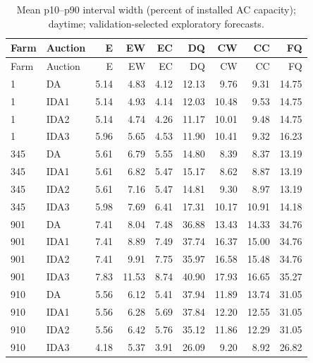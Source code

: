 \documentclass[11pt,a4paper]{article}
\begin{document}
\begin{longtable}{llrrrrrrr}
\caption{Mean p10--p90 interval width (percent of installed AC capacity); daytime; validation-selected exploratory forecasts.}\\
\toprule Farm & Auction & E & EW & EC & DQ & CW & CC & FQ \\
\midrule\endfirsthead
\toprule Farm & Auction & E & EW & EC & DQ & CW & CC & FQ \\
\midrule\endhead
1 & DA & 5.14 & 4.83 & 4.12 & 12.13 & 9.76 & 9.31 & 14.75 \\
1 & IDA1 & 5.14 & 4.93 & 4.14 & 12.03 & 10.48 & 9.53 & 14.75 \\
1 & IDA2 & 5.14 & 4.74 & 4.26 & 11.17 & 10.01 & 9.48 & 14.75 \\
1 & IDA3 & 5.96 & 5.65 & 4.53 & 11.90 & 10.41 & 9.32 & 16.23 \\
\midrule
345 & DA & 5.61 & 6.79 & 5.55 & 14.80 & 8.39 & 8.37 & 13.19 \\
345 & IDA1 & 5.61 & 6.82 & 5.47 & 15.17 & 8.62 & 8.87 & 13.19 \\
345 & IDA2 & 5.61 & 7.16 & 5.47 & 14.81 & 9.30 & 8.97 & 13.19 \\
345 & IDA3 & 5.98 & 7.69 & 6.41 & 17.31 & 10.17 & 10.91 & 14.18 \\
\midrule
901 & DA & 7.41 & 8.04 & 7.48 & 36.88 & 13.43 & 14.33 & 34.76 \\
901 & IDA1 & 7.41 & 8.89 & 7.49 & 37.74 & 16.37 & 15.00 & 34.76 \\
901 & IDA2 & 7.41 & 9.91 & 7.75 & 35.97 & 16.58 & 15.48 & 34.76 \\
901 & IDA3 & 7.83 & 11.53 & 8.74 & 40.90 & 17.93 & 16.65 & 35.27 \\
\midrule
910 & DA & 5.56 & 6.12 & 5.41 & 37.94 & 11.89 & 13.74 & 31.05 \\
910 & IDA1 & 5.56 & 6.28 & 5.69 & 37.84 & 12.20 & 12.55 & 31.05 \\
910 & IDA2 & 5.56 & 6.42 & 5.76 & 35.12 & 11.86 & 12.29 & 31.05 \\
910 & IDA3 & 4.18 & 5.37 & 3.91 & 26.09 & 9.20 & 8.92 & 26.82 \\
\midrule
\bottomrule\end{longtable}
\normalsize
\end{document}
